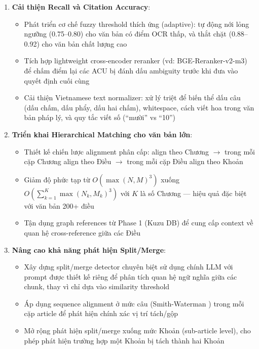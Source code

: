 \begin{enumerate}[label=\textbf{(\arabic*)}]

    \item \textbf{Cải thiện Recall và Citation Accuracy}:
    \begin{itemize}
        \item Phát triển cơ chế fuzzy threshold thích ứng (adaptive): tự động nới lỏng ngưỡng (0.75--0.80) cho văn bản có điểm OCR thấp, và thắt chặt (0.88--0.92) cho văn bản chất lượng cao
        \item Tích hợp lightweight cross-encoder reranker (vd: BGE-Reranker-v2-m3) để chấm điểm lại các ACU bị đánh dấu ambiguity trước khi đưa vào quyết định cuối cùng
        \item Cải thiện Vietnamese text normalizer: xử lý triệt để biến thể dấu câu (dấu chấm, dấu phẩy, dấu hai chấm), whitespace, cách viết hoa trong văn bản pháp lý, và quy tắc viết số (``mười'' vs ``10'')
    \end{itemize}

    \item \textbf{Triển khai Hierarchical Matching cho văn bản lớn}:
    \begin{itemize}
        \item Thiết kế chiến lược alignment phân cấp: align theo Chương $\rightarrow$ trong mỗi cặp Chương align theo Điều $\rightarrow$ trong mỗi cặp Điều align theo Khoản
        \item Giảm độ phức tạp từ $O(\max(N,M)^3)$ xuống $O(\sum_{k=1}^{K} \max(N_k, M_k)^3)$ với $K$ là số Chương — hiệu quả đặc biệt với văn bản 200+ điều
        \item Tận dụng graph references từ Phase 1 (Kuzu DB) để cung cấp context về quan hệ cross-reference giữa các Điều
    \end{itemize}

    \item \textbf{Nâng cao khả năng phát hiện Split/Merge}:
    \begin{itemize}
        \item Xây dựng split/merge detector chuyên biệt sử dụng chính LLM với prompt được thiết kế riêng để phân tích quan hệ ngữ nghĩa giữa các chunk, thay vì chỉ dựa vào similarity threshold
        \item Áp dụng sequence alignment ở mức câu (Smith-Waterman \cite{needleman1970general}) trong mỗi cặp article để phát hiện chính xác vị trí tách/gộp
        \item Mở rộng phát hiện split/merge xuống mức Khoản (sub-article level), cho phép phát hiện trường hợp một Khoản bị tách thành hai Khoản
    \end{itemize}


\end{enumerate}
